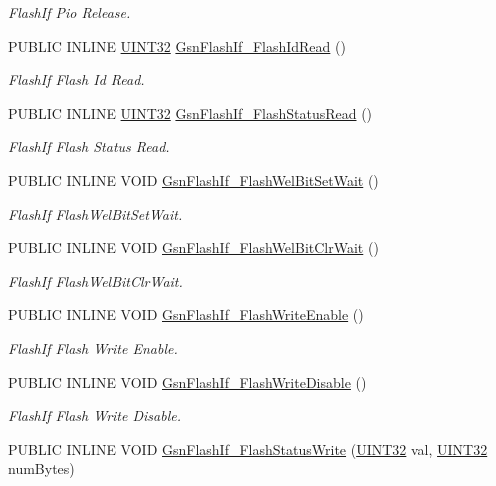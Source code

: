 \begin{DoxyCompactItemize}
\begin{DoxyCompactList}\small\item\em FlashIf Pio Release. \end{DoxyCompactList}\item 
PUBLIC INLINE \hyperlink{a00660_gae1e6edbbc26d6fbc71a90190d0266018}{UINT32} \hyperlink{a00647_ga9bd33077456561b3a74960e3b59fd3a1}{GsnFlashIf\_\-FlashIdRead} ()
\begin{DoxyCompactList}\small\item\em FlashIf Flash Id Read. \end{DoxyCompactList}\item 
PUBLIC INLINE \hyperlink{a00660_gae1e6edbbc26d6fbc71a90190d0266018}{UINT32} \hyperlink{a00647_ga48297488ec4d500970cb6950cae78570}{GsnFlashIf\_\-FlashStatusRead} ()
\begin{DoxyCompactList}\small\item\em FlashIf Flash Status Read. \end{DoxyCompactList}\item 
PUBLIC INLINE VOID \hyperlink{a00647_gaa4154e89e9e4a898ea3201fe01399563}{GsnFlashIf\_\-FlashWelBitSetWait} ()
\begin{DoxyCompactList}\small\item\em FlashIf FlashWelBitSetWait. \end{DoxyCompactList}\item 
PUBLIC INLINE VOID \hyperlink{a00647_gacbb20c31b55b63691495359dad00ccc6}{GsnFlashIf\_\-FlashWelBitClrWait} ()
\begin{DoxyCompactList}\small\item\em FlashIf FlashWelBitClrWait. \end{DoxyCompactList}\item 
PUBLIC INLINE VOID \hyperlink{a00647_ga73f637bd9c4acf82825974b750102043}{GsnFlashIf\_\-FlashWriteEnable} ()
\begin{DoxyCompactList}\small\item\em FlashIf Flash Write Enable. \end{DoxyCompactList}\item 
PUBLIC INLINE VOID \hyperlink{a00647_gaa765eb6f46ca5e3787deb574e035a43b}{GsnFlashIf\_\-FlashWriteDisable} ()
\begin{DoxyCompactList}\small\item\em FlashIf Flash Write Disable. \end{DoxyCompactList}\item 
PUBLIC INLINE VOID \hyperlink{a00647_ga3a7eea5fe3bb3b96a573037b355c0c0e}{GsnFlashIf\_\-FlashStatusWrite} (\hyperlink{a00660_gae1e6edbbc26d6fbc71a90190d0266018}{UINT32} val, \hyperlink{a00660_gae1e6edbbc26d6fbc71a90190d0266018}{UINT32} numBytes)

\end{DoxyCompactItemize}

